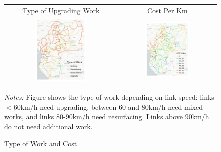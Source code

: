 \documentclass[a4paper]{article}
\begin{document}
\begin{figure}[H] \vspace{-1mm}
\centering
\caption{\label{fig:CTW} Type of Work and Cost}
\vspace{2mm}
\begin{tabular}{cc}
Type of Upgrading Work & Cost Per Km \\
\includegraphics[width=0.48\textwidth]{"../figures/trans_CEMAC_network_type_of_work_google.pdf"} &
\includegraphics[width=0.48\textwidth]{"../figures/trans_CEMAC_network_all_costs_google.pdf"} \\ [-0.2em]
\end{tabular}
\scriptsize 
\emph{Notes:} Figure shows the type of work depending on link speed: links $<$60km/h need upgrading, between 60 and 80km/h need mixed works, and links 80-90km/h need resurfacing. Links above 90km/h do not need additional work. \\ \vspace{-0.5cm}
\end{figure}
\end{document}

